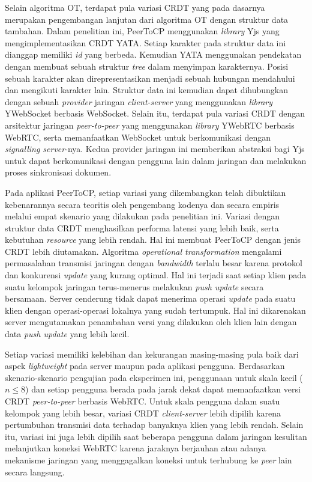Selain algoritma OT, terdapat pula variasi CRDT yang pada dasarnya merupakan pengembangan lanjutan dari algoritma OT dengan struktur data tambahan. Dalam penelitian ini, PeerToCP menggunakan \textit{library} Yjs yang mengimplementasikan CRDT YATA. Setiap karakter pada struktur data ini dianggap memiliki \textit{id} yang berbeda. Kemudian YATA menggunakan pendekatan dengan membuat sebuah struktur \textit{tree} dalam menyimpan karakternya. Posisi sebuah karakter akan direpresentasikan menjadi sebuah hubungan mendahului dan mengikuti karakter lain. Struktur data ini kemudian dapat dihubungkan dengan sebuah \textit{provider} jaringan \textit{client-server} yang menggunakan \textit{library} YWebSocket berbasis WebSocket. Selain itu, terdapat pula variasi CRDT dengan arsitektur jaringan \textit{peer-to-peer} yang menggunakan \textit{library} YWebRTC berbasis WebRTC, serta memanfaatkan WebSocket untuk berkomunikasi dengan \textit{signalling server}-nya. Kedua provider jaringan ini memberikan abstraksi bagi Yjs untuk dapat berkomunikasi dengan pengguna lain dalam jaringan dan melakukan proses sinkronisasi dokumen.

Pada aplikasi PeerToCP, setiap variasi yang dikembangkan telah dibuktikan kebenarannya secara teoritis oleh pengembang kodenya dan secara empiris melalui empat skenario yang dilakukan pada penelitian ini. Variasi dengan struktur data CRDT menghasilkan performa latensi yang lebih baik, serta kebutuhan \textit{resource} yang lebih rendah. Hal ini membuat PeerToCP dengan jenis CRDT lebih diutamakan. Algoritma \textit{operational transformation} mengalami permasalahan transmisi jaringan dengan \textit{bandwidth} terlalu besar karena protokol dan konkurensi \textit{update} yang kurang optimal. Hal ini terjadi saat setiap klien pada suatu kelompok jaringan terus-menerus melakukan \textit{push update} secara bersamaan. Server cenderung tidak dapat menerima operasi \textit{update} pada suatu klien dengan operasi-operasi lokalnya yang sudah tertumpuk. Hal ini dikarenakan server mengutamakan penambahan versi yang dilakukan oleh klien lain dengan data \textit{push update} yang lebih kecil.

Setiap variasi memiliki kelebihan dan kekurangan masing-masing pula baik dari aspek \textit{lightweight} pada server maupun pada aplikasi pengguna. Berdasarkan skenario-skenario pengujian pada eksperimen ini, penggunaan untuk skala kecil ($n \leq 8$) dan setiap pengguna berada pada jarak dekat dapat memanfaatkan versi CRDT \textit{peer-to-peer} berbasis WebRTC. Untuk skala pengguna dalam suatu kelompok yang lebih besar, variasi CRDT \textit{client-server} lebih dipilih karena pertumbuhan transmisi data terhadap banyaknya klien yang lebih rendah. Selain itu, variasi ini juga lebih dipilih saat beberapa pengguna dalam jaringan kesulitan melanjutkan koneksi WebRTC karena jaraknya berjauhan atau adanya mekanisme jaringan yang menggagalkan koneksi untuk terhubung ke \textit{peer} lain secara langsung.

